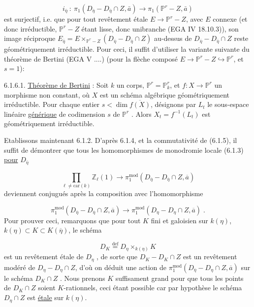\begin{equation}\tag{6.1.6}
i_{\bar{\eta}} \ : \ \pi_1(D_{\bar{\eta}} - D_{\bar{\eta}} \cap Z, \bar{a}) \longrightarrow \pi_1(\mathbb{P}^r - Z, \bar{a})
\end{equation}
est surjectif, i.e. que pour tout revêtement étale $E \longrightarrow \mathbb{P}^r - Z$, avec $E$ connexe (et donc irréductible, $\mathbb{P}^r - Z$ étant lisse, donc unibranche (EGA IV 18.10.3)), son image réciproque $E_{\bar{\eta}} = E \times_{\mathbb{P}^r - Z} (D_{\bar{\eta}} - D_{\bar{\eta}} \cap Z)$ au-dessus de $D_{\bar{\eta}} - D_{\bar{\eta}} \cap Z$ reste géométriquement irréductible. Pour ceci, il suffit d'utiliser la variante suivante du théorème de Bertini (EGA V ....) (pour la flèche composé $E \longrightarrow \mathbb{P}^r - Z \hookrightarrow \mathbb{P}^r$, et $s = 1$):

6.1.6.1. \underline{Théorème de Bertini} : Soit $k$ un corps, $\mathbb{P}^r = \mathbb{P}^r_k$, et $f : X \longrightarrow \mathbb{P}^r$ un morphisme non constant, où $X$ est un schéma algébrique géométriquement irréductible. Pour chaque entier $s < \dim \overline{f(X)}$, désignons par $L_t$ le sous-espace linéaire \underline{générique} de codimension $s$ de $\mathbb{P}^r$ . Alors $X_t = f^{-1}(L_t)$ est géométriquement irréductible.

Etablissons maintenant 6.1.2. D'après 6.1.4, et la commutativité de (6.1.5), il suffit de démontrer que tous les homomorphismes de monodromie locale (6.1.3) \underline{pour} $D_{\bar{\eta}}$ 



\begin{equation}\tag{6.1.7.1}
 \prod_{\ell \neq \mathrm{car}(k)} \mathbb{Z}_{\ell}(1) \longrightarrow \pi_1^{\mathrm{mod}}(D_{\overline{\eta}} - D_{\overline{\eta}} \cap Z, \overline{a})
\end{equation}
deviennent conjugués après la composition avec l'homomorphisme

\begin{equation}\tag{6.1.7.2}
\pi_1^{\mathrm{mod}}(D_{\overline{\eta}} - D_{\overline{\eta}} \cap Z, \overline{a}) \longrightarrow \pi_1^{\mathrm{mod}}(D_{\eta} - D_{\eta} \cap Z, \overline{a}) \; .
\end{equation}
Pour prouver ceci, remarquons que pour tout $K$ fini et galoisien sur $k(\eta)$, $k(\eta) \subset K \subset K(\overline{\eta})$, le schéma

\begin{equation*}
D_K \stackrel{\mathrm{def}}{=} D_{\eta} \times_{k(\eta)} K
\end{equation*}
est un revêtement étale de $D_{\eta}$ , de sorte que $D_K - D_K \cap Z$ est un revêtement modéré de $D_{\eta} - D_{\eta} \cap Z$, d'où on déduit une action de $\pi_1^{\mathrm{mod}}(D_{\overline{\eta}} - D_{\eta} \cap Z, \overline{a})$ sur le schéma $D_K \cap Z$ . Nous prenons $K$ suffisament grand pour que tous les points de $D_K \cap Z$ soient $K$-rationnels, ceci étant possible car par hypothèse le schéma $D_{\eta} \cap Z$ est \underline{étale} sur $k(\eta)$.

